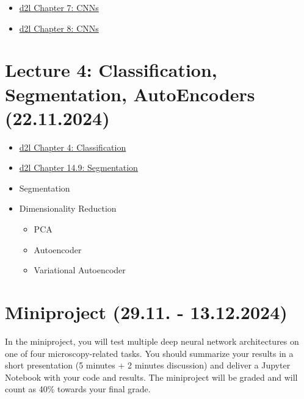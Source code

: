\documentclass[
]{agujournal2019}
\providecommand{\tightlist}{%
  \setlength{\itemsep}{0pt}\setlength{\parskip}{0pt}}\usepackage{longtable,booktabs,array}
\begin{document}
\begin{itemize}
\tightlist
\item
  \href{https://d2l.ai/chapter_convolutional-neural-networks/index.html}{d2l
  Chapter 7: CNNs}
\item
  \href{https://d2l.ai/chapter_convolutional-modern/index.html}{d2l
  Chapter 8: CNNs}
\end{itemize}

\section{Lecture 4: Classification, Segmentation, AutoEncoders
(22.11.2024)}\label{sec-lecture4}

\begin{itemize}
\tightlist
\item
  \href{https://d2l.ai/chapter_linear-classification/index.html}{d2l
  Chapter 4: Classification}
\item
  \href{https://d2l.ai/chapter_computer-vision/semantic-segmentation-and-dataset.html}{d2l
  Chapter 14.9: Segmentation}
\item
  Segmentation
\item
  Dimensionality Reduction

  \begin{itemize}
  \tightlist
  \item
    PCA
  \item
    Autoencoder
  \item
    Variational Autoencoder
  \end{itemize}
\end{itemize}

\section{Miniproject (29.11. - 13.12.2024)}\label{sec-lecture5}

In the miniproject, you will test multiple deep neural network
architectures on one of four microscopy-related tasks. You should
summarize your results in a short presentation (5 minutes + 2 minutes
discussion) and deliver a Jupyter Notebook with your code and results.
The miniproject will be graded and will count as 40\% towards your final
grade.
\end{document}
